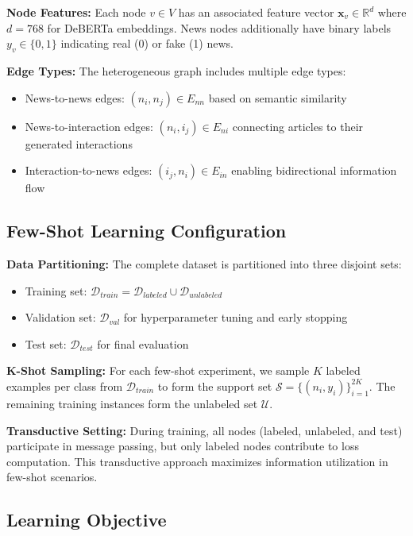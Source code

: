 \textbf{Node Features:} Each node $v \in V$ has an associated feature vector $\mathbf{x}_v \in \mathbb{R}^d$ where $d = 768$ for DeBERTa embeddings. News nodes additionally have binary labels $y_v \in \{0, 1\}$ indicating real (0) or fake (1) news.

\textbf{Edge Types:} The heterogeneous graph includes multiple edge types:
\begin{itemize}
\item News-to-news edges: $(n_i, n_j) \in E_{nn}$ based on semantic similarity
\item News-to-interaction edges: $(n_i, i_j) \in E_{ni}$ connecting articles to their generated interactions  
\item Interaction-to-news edges: $(i_j, n_i) \in E_{in}$ enabling bidirectional information flow
\end{itemize}

\subsection{Few-Shot Learning Configuration}

\textbf{Data Partitioning:} The complete dataset is partitioned into three disjoint sets:
\begin{itemize}
\item Training set: $\mathcal{D}_{train} = \mathcal{D}_{labeled} \cup \mathcal{D}_{unlabeled}$
\item Validation set: $\mathcal{D}_{val}$ for hyperparameter tuning and early stopping
\item Test set: $\mathcal{D}_{test}$ for final evaluation
\end{itemize}

\textbf{K-Shot Sampling:} For each few-shot experiment, we sample $K$ labeled examples per class from $\mathcal{D}_{train}$ to form the support set $\mathcal{S} = \{(n_i, y_i)\}_{i=1}^{2K}$. The remaining training instances form the unlabeled set $\mathcal{U}$.

\textbf{Transductive Setting:} During training, all nodes (labeled, unlabeled, and test) participate in message passing, but only labeled nodes contribute to loss computation. This transductive approach maximizes information utilization in few-shot scenarios.

\subsection{Learning Objective}

